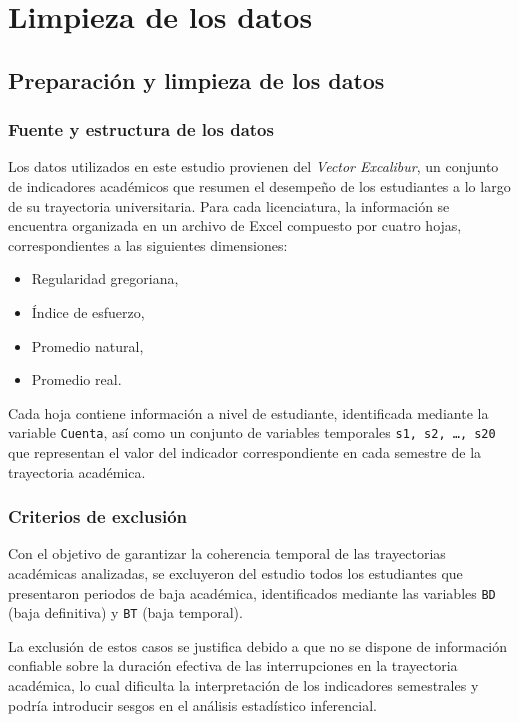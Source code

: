\chapter{Limpieza de los datos}
\section{Preparación y limpieza de los datos}

\subsection{Fuente y estructura de los datos}

Los datos utilizados en este estudio provienen del \textit{Vector Excalibur}, un conjunto de
indicadores académicos que resumen el desempeño de los estudiantes a lo largo de su trayectoria
universitaria. Para cada licenciatura, la información se encuentra organizada en un archivo de
Excel compuesto por cuatro hojas, correspondientes a las siguientes dimensiones:

\begin{itemize}
    \item Regularidad gregoriana,
    \item Índice de esfuerzo,
    \item Promedio natural,
    \item Promedio real.
\end{itemize}

Cada hoja contiene información a nivel de estudiante, identificada mediante la variable
\texttt{Cuenta}, así como un conjunto de variables temporales \texttt{s1, s2, \ldots, s20} que
representan el valor del indicador correspondiente en cada semestre de la trayectoria académica.

\subsection{Criterios de exclusión}

Con el objetivo de garantizar la coherencia temporal de las trayectorias académicas analizadas,
se excluyeron del estudio todos los estudiantes que presentaron periodos de baja académica,
identificados mediante las variables \texttt{BD} (baja definitiva) y \texttt{BT} (baja temporal).

La exclusión de estos casos se justifica debido a que no se dispone de información confiable sobre
la duración efectiva de las interrupciones en la trayectoria académica, lo cual dificulta la
interpretación de los indicadores semestrales y podría introducir sesgos en el análisis
estadístico inferencial.


